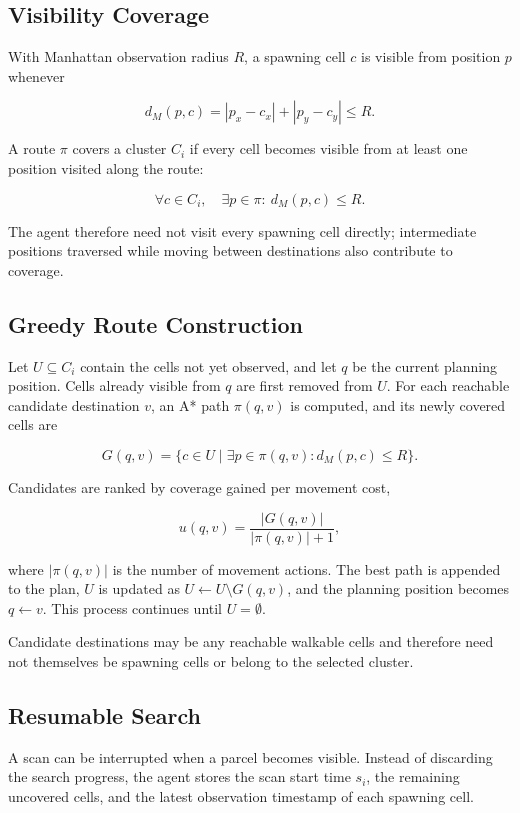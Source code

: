 \documentclass[a4paper]{article}
\begin{document}
\subsection{Visibility Coverage}

With Manhattan observation radius $R$, a spawning cell $c$ is visible from
position $p$ whenever

\[
    d_M(p,c)=|p_x-c_x|+|p_y-c_y| \leq R.
\]

A route $\pi$ covers a cluster $C_i$ if every cell becomes visible from at
least one position visited along the route:

\[
    \forall c\in C_i,\quad
    \exists p\in\pi:\ d_M(p,c)\leq R.
\]

The agent therefore need not visit every spawning cell directly; intermediate
positions traversed while moving between destinations also contribute to
coverage.

\subsection{Greedy Route Construction}

Let $U\subseteq C_i$ contain the cells not yet observed, and let $q$ be the
current planning position. Cells already visible from $q$ are first removed
from $U$. For each reachable candidate destination $v$, an A* path
$\pi(q,v)$ is computed, and its newly covered cells are

\[
    G(q,v)
    =
    \{c\in U \mid \exists p\in\pi(q,v):
    d_M(p,c)\leq R\}.
\]

Candidates are ranked by coverage gained per movement cost,

\[
    u(q,v)=\frac{|G(q,v)|}{|\pi(q,v)|+1},
\]

where $|\pi(q,v)|$ is the number of movement actions. The best path is appended
to the plan, $U$ is updated as $U\leftarrow U\setminus G(q,v)$, and the
planning position becomes $q\leftarrow v$. This process continues until
$U=\emptyset$.

Candidate destinations may be any reachable walkable cells and therefore need
not themselves be spawning cells or belong to the selected cluster.

\subsection{Resumable Search}

A scan can be interrupted when a parcel becomes visible. Instead of discarding
the search progress, the agent stores the scan start time $s_i$, the remaining
uncovered cells, and the latest observation timestamp of each spawning cell.
\end{document}
